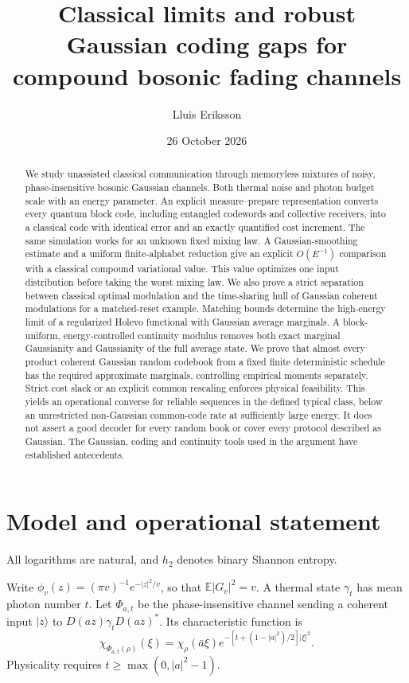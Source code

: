 \documentclass[11pt]{article}
\title{Classical limits and robust Gaussian coding gaps\newline
for compound bosonic fading channels}
\author{Lluis Eriksson}
\date{26 October 2026}
\newcommand{\E}{\mathbb E}
\begin{document}
\maketitle
\begin{abstract}
We study unassisted classical communication through memoryless mixtures
of noisy, phase-insensitive bosonic Gaussian channels. Both thermal noise
and photon budget scale with an energy parameter. An explicit
measure--prepare representation converts every quantum block code,
including entangled codewords and collective receivers, into a classical
code with identical error and an exactly quantified cost increment.
The same simulation works for an unknown fixed mixing law.
A Gaussian-smoothing estimate and a uniform finite-alphabet reduction
give an explicit \(O(E^{-1})\) comparison with a classical compound
variational value. This value optimizes one input distribution before
taking the worst mixing law. We also prove a strict separation
between classical optimal modulation and the time-sharing hull of Gaussian
coherent modulations for a matched-reset example. Matching bounds determine the high-energy limit of a regularized
Holevo functional with Gaussian average marginals. A block-uniform,
energy-controlled continuity modulus removes both exact marginal
Gaussianity and Gaussianity of the full average state. We prove that
almost every product coherent Gaussian random codebook from a fixed
finite deterministic schedule has the required approximate marginals,
controlling empirical moments separately. Strict cost slack or an
explicit common rescaling enforces physical feasibility. This yields
an operational converse for reliable sequences in the defined typical
class, below an unrestricted non-Gaussian common-code rate at sufficiently
large energy. It does not assert a good decoder for every random book
or cover every protocol described as Gaussian. The Gaussian, coding and
continuity tools used in the argument have established antecedents.
\end{abstract}

\section{Model and operational statement}

All logarithms are natural, and \(h_2\) denotes binary Shannon entropy.

Write
\(\phi_v(z)=(\pi v)^{-1}e^{-|z|^2/v}\), so that
\(\E|G_v|^2=v\). A thermal state \(\gamma_t\) has mean photon
number \(t\). Let \(\Phi_{a,t}\) be the phase-insensitive channel
sending a coherent input \(|z\rangle\) to
\(D(az)\gamma_tD(az)^*\). Its characteristic function is
\[
 \chi_{\Phi_{a,t}(\rho)}(\xi)=
 \chi_\rho(\bar a\xi)
 e^{-[t+(1-|a|^2)/2]|\xi|^2}.
\]
Physicality requires \(t\geq \max(0,|a|^2-1)\).
\end{document}
